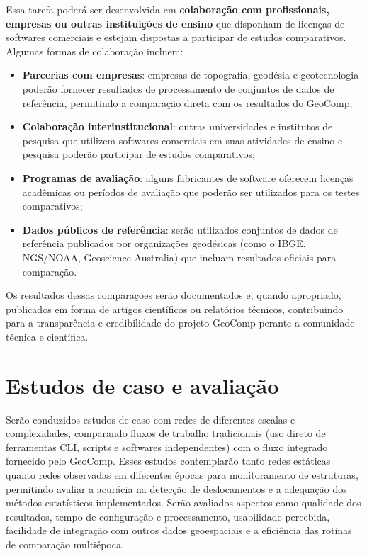 \documentclass[
        12pt,                           %
        openright,                      %
        oneside,
        a4paper,                        %
        chapter=TITLE,         %
        section=TITLE,         %
        subsection=Title,      %
        english,                        %
        portugues,                      %
        ]{abntex2}
\begin{document}
Essa tarefa poderá ser desenvolvida em \textbf{colaboração com profissionais, empresas ou outras instituições de ensino} que disponham de licenças de softwares comerciais e estejam dispostas a participar de estudos comparativos. Algumas formas de colaboração incluem:

\begin{itemize}
    \item \textbf{Parcerias com empresas}: empresas de topografia, geodésia e geotecnologia poderão fornecer resultados de processamento de conjuntos de dados de referência, permitindo a comparação direta com os resultados do GeoComp;
    \item \textbf{Colaboração interinstitucional}: outras universidades e institutos de pesquisa que utilizem softwares comerciais em suas atividades de ensino e pesquisa poderão participar de estudos comparativos;
    \item \textbf{Programas de avaliação}: alguns fabricantes de software oferecem licenças acadêmicas ou períodos de avaliação que poderão ser utilizados para os testes comparativos;
    \item \textbf{Dados públicos de referência}: serão utilizados conjuntos de dados de referência publicados por organizações geodésicas (como o IBGE, NGS/NOAA, Geoscience Australia) que incluam resultados oficiais para comparação.
\end{itemize}

Os resultados dessas comparações serão documentados e, quando apropriado, publicados em forma de artigos científicos ou relatórios técnicos, contribuindo para a transparência e credibilidade do projeto GeoComp perante a comunidade técnica e científica.


\section{Estudos de caso e avaliação}

Serão conduzidos estudos de caso com redes de diferentes escalas e complexidades, comparando fluxos de trabalho tradicionais (uso direto de ferramentas CLI, scripts e softwares independentes) com o fluxo integrado fornecido pelo GeoComp. Esses estudos contemplarão tanto redes estáticas quanto redes observadas em diferentes épocas para monitoramento de estruturas, permitindo avaliar a acurácia na detecção de deslocamentos e a adequação dos métodos estatísticos implementados. Serão avaliados aspectos como qualidade dos resultados, tempo de configuração e processamento, usabilidade percebida, facilidade de integração com outros dados geoespaciais e a eficiência das rotinas de comparação multiépoca.
\end{document}
